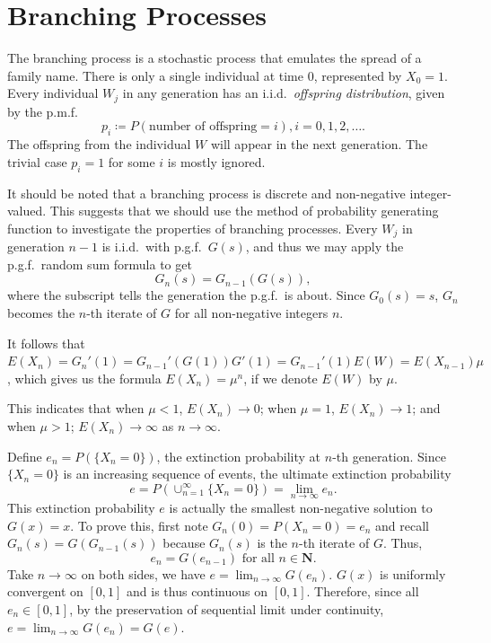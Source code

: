 \documentclass[11pt]{article}
\newcommand{\N}{\mathbf{N}}
\begin{document}

\newpage
\section{Branching Processes}

The branching process is a stochastic process that emulates the spread of a family name. There is only a single individual at time 0, represented by $X_{0}=1$. Every individual $W_{j}$ in any generation has an i.i.d.\ \textit{offspring distribution}, given by the p.m.f.
\[
p_{i}\coloneqq P(\text{number of offspring}=i),i=0,1,2,\dots .
\]
The offspring from the individual $W$ will appear in the next generation. The trivial case 
$p_{i}=1$ for some $i$ is mostly ignored.

It should be noted that a branching process is discrete and non-negative integer-valued. This suggests that we should use the method of probability generating function to investigate the properties of branching processes. Every $W_{j}$ in generation $n- 1$ is i.i.d.\ with p.g.f.\ $G(s)$, and thus we may apply the p.g.f.\ random sum formula to get
\[
G_{n}(s)=G_{n-1}(G(s)),
\]
where the subscript tells the generation the p.g.f.\ is about. Since $G_{0}(s)=s$, $G_{n}$ becomes the $n$-th iterate of $G$ for all non-negative integers $n$.

It follows that $E(X_{n})=G_{n}'(1)=G_{n- 1}'(G(1))G'(1)=G_{n- 1}'(1)E(W)=E(X_{n- 1})\mu $, which gives us the formula $E(X_{n})=\mu ^{n}$, if we denote $E(W)$ by $\mu $.

This indicates that when $\mu <1$, $E(X_{n})\rightarrow 0$; when $\mu =1$, $E(X_{n})\rightarrow 1$; and when $\mu >1$; $E(X_{n})\rightarrow \infty $ as $n\rightarrow \infty $.

Define $e_{n}=P(\{X_{n}=0\})$, the extinction probability at $n$-th generation. Since $\{X_{n}=0\}$ is an increasing sequence of events, the ultimate extinction probability
\[
e=P(\cup _{n=1}^{\infty }\{X_{n}=0\})=\lim _{n \to \infty }e_{n}.
\]
This extinction probability $e$ is actually the smallest non-negative solution to $G(x)=x$. To prove this, first note $G_{n}(0)=P(X_{n}=0)=e_{n}$ and recall $G_{n}(s)=G(G_{n- 1}(s))$ because $G_{n}(s)$ is the $n$-th iterate of $G$. Thus,
\[
e_{n}=G(e_{n- 1}) \text{ for all } n\in \N .
\]
Take $n\rightarrow \infty $ on both sides, we have $e=\lim _{n\rightarrow \infty }G(e_{n})$. $G(x)$ is uniformly convergent on 
$[0,1]$ and is thus continuous on $[0,1]$. Therefore, since all $e_{n}\in [0,1]$, by the preservation of sequential limit under continuity, $e=\lim _{n\rightarrow \infty }G(e_{n})=G(e)$.
\end{document}
